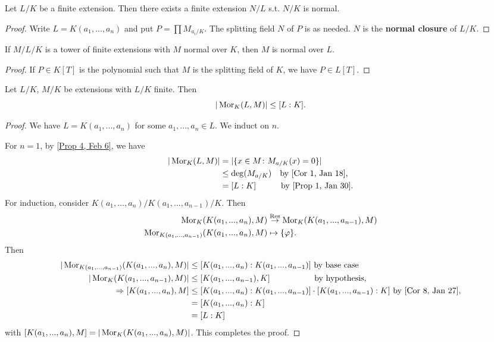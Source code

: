 \begin{fact} \label{Fact 1, Feb 10}
	Let $L/K$ be a finite extension. Then there exists a finite extension $N/L$ s.t. $N/K$ is normal.
\end{fact}

\begin{proof}
	Write $L = K(a_1,..., a_n)$ and put $P = \prod M_{a_i/K}$. The splitting field $N$ of $P$ is as needed. $N$ is the \textbf{normal closure} of $L/K$.
\end{proof}

\begin{fact} \label{Fact 2, Feb 10}
	If $M/L/K$ is a tower of finite extensions with $M$ normal over $K$, then $M$ is normal over $L$.
\end{fact}

\begin{proof}
	If $P \in K[T]$ is the polynomial such that $M$ is the splitting field of $K$, we have $P \in L[T]$.
\end{proof}

\begin{prop} \label{Prop 3, Feb 10}
	Let $L/K$, $M/K$ be extensions with $L/K$ finite. Then
	\[|\operatorname{Mor}_K(L,M)| \leq [L : K].\]
\end{prop}

\begin{proof}
	We have $L = K(a_1, ..., a_n)$ for some $a_1, ..., a_n \in L$. We induct on $n$.

	For $n = 1$, by \ref{Prop 4, Feb 6}, we have
	\begin{align*}
	|\operatorname{Mor}_K(L,M)| &= |\{x \in M \colon M_{a/K}(x) = 0\}| \\
	&\leq \deg(M_{a/K}) \quad \text{by \ref{Cor 1, Jan 18},} \\
	&= [L : K] \qquad \quad \text{by \ref{Prop 1, Jan 30}.}
	\end{align*}
	For induction, consider $K(a_1, ..., a_n)/K(a_1, ..., a_{n-1})/K$.  Then
	\begin{align*}
	\operatorname{Mor}_K(K(a_1, ..., a_n), M) &\stackrel{\text{Res}}{\rightarrow} \operatorname{Mor}_K(K(a_1, ..., a_{n-1}), M) \\
	\operatorname{Mor}_{K(a_1, ..., a_{n-1})}(K(a_1, ..., a_n), M) &\mapsto \{\varphi\}.
	\end{align*}
	Then
	\begin{align*}
	|\operatorname{Mor}_{K(a_1, ..., a_{n-1})}(K(a_1, ..., a_n), M)| &\leq [K(a_1, ..., a_n) : K(a_1, ..., a_{n-1})] \text{ by base case} \\
	|\operatorname{Mor}_K(K(a_1, ..., a_{n-1}), M)| &\leq [K(a_1, ..., a_{n-1}), K] \qquad \qquad \quad \text{ by hypothesis,} \\
	\Rightarrow [K(a_1, ..., a_n), M] &\leq [K(a_1, ..., a_n) : K(a_1, ..., a_{n-1})] \cdot [K(a_1, ..., a_{n-1}) : K] \text{ by \ref{Cor 8, Jan 27},} \\
	&= [K(a_1, ..., a_n) : K] \\
	&= [L : K]
	\end{align*}
	with $[K(a_1, ..., a_n), M] = |\operatorname{Mor}_K(K(a_1, ..., a_n), M)|$. This completes the proof.
\end{proof}

